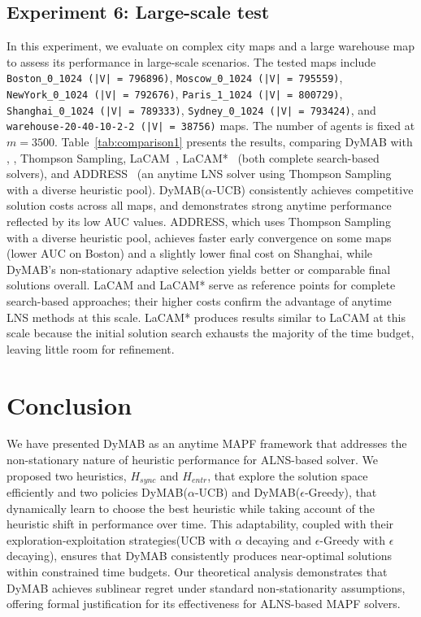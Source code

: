 \documentclass[review]{jair}
\begin{document}
\subsection{Experiment 6: Large-scale test}
In this experiment, we evaluate  on complex city maps and a large warehouse map to assess its performance in large-scale scenarios. The tested maps include 
\texttt{Boston\_0\_1024 (|V| = 796896)}, 
\texttt{Moscow\_0\_1024 (|V| = 795559)}, 
\texttt{NewYork\_0\_1024 (|V| = 792676)}, 
\texttt{Paris\_1\_1024 (|V| = 800729)}, 
\texttt{Shanghai\_0\_1024 (|V| = 789333)}, 
\texttt{Sydney\_0\_1024 (|V| = 793424)}, and 
\texttt{warehouse-20-40-10-2-2 (|V| = 38756)} maps. 
 The number of agents is fixed at $m=3500$. 
Table~\ref{tab:comparison1} presents the results, comparing DyMAB with , , Thompson Sampling, LaCAM~\citep{LaCam}, LaCAM*~\citep{LaCamStar} (both complete search-based solvers), and ADDRESS~\citep{ADDRESS} (an anytime LNS solver using Thompson Sampling with a diverse heuristic pool).
DyMAB($\alpha$-UCB) consistently achieves competitive solution costs across all maps, and demonstrates strong anytime performance reflected by its low AUC values. ADDRESS, which uses Thompson Sampling with a diverse heuristic pool, achieves faster early convergence on some maps (lower AUC on Boston) and a slightly lower final cost on Shanghai, while DyMAB's non-stationary adaptive selection yields better or comparable final solutions overall. LaCAM and LaCAM* serve as reference points for complete search-based approaches; their higher costs confirm the advantage of anytime LNS methods at this scale. LaCAM* produces results similar to LaCAM at this scale because the initial solution search exhausts the majority of the time budget, leaving little room for refinement.

\section{Conclusion} \label{sec:conclusion}
We have presented DyMAB as an anytime MAPF framework that addresses the non-stationary nature of heuristic performance for ALNS-based solver. We proposed two heuristics, $H_{sync}$ and $H_{entr}$, that explore the solution space efficiently and two policies DyMAB($\alpha$-UCB) and DyMAB($\epsilon$-Greedy), that dynamically learn to choose the best heuristic while taking account of the heuristic shift in performance over time. This adaptability, coupled with their exploration-exploitation strategies(UCB with $\alpha$ decaying and $\epsilon$-Greedy with $\epsilon$ decaying), ensures that DyMAB consistently produces near-optimal solutions within constrained time budgets.
Our theoretical analysis demonstrates that DyMAB achieves sublinear regret under standard non-stationarity assumptions, offering formal justification for its effectiveness for ALNS-based MAPF solvers. 
\end{document}
